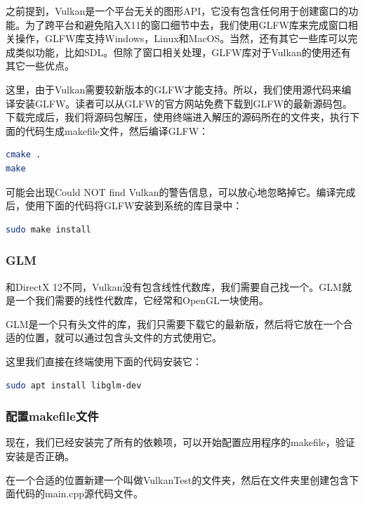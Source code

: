 \documentclass{ctexart}
\begin{document}
之前提到，Vulkan是一个平台无关的图形API，它没有包含任何用于创建窗口的功能。为了跨平台和避免陷入X11的窗口细节中去，我们使用GLFW库来完成窗口相关操作，GLFW库支持Windows，Linux和MacOS。当然，还有其它一些库可以完成类似功能，比如SDL。但除了窗口相关处理，GLFW库对于Vulkan的使用还有其它一些优点。

这里，由于Vulkan需要较新版本的GLFW才能支持。所以，我们使用源代码来编译安装GLFW。读者可以从GLFW的官方网站免费下载到GLFW的最新源码包。下载完成后，我们将源码包解压，使用终端进入解压的源码所在的文件夹，执行下面的代码生成makefile文件，然后编译GLFW：

\begin{lstlisting}[language={bash}]
cmake .
make
\end{lstlisting}

可能会出现Could NOT find Vulkan的警告信息，可以放心地忽略掉它。编译完成后，使用下面的代码将GLFW安装到系统的库目录中：

\begin{lstlisting}[language={bash}]
sudo make install
\end{lstlisting}

\subsubsection{GLM}

和DirectX 12不同，Vulkan没有包含线性代数库，我们需要自己找一个。GLM就是一个我们需要的线性代数库，它经常和OpenGL一块使用。

GLM是一个只有头文件的库，我们只需要下载它的最新版，然后将它放在一个合适的位置，就可以通过包含头文件的方式使用它。

这里我们直接在终端使用下面的代码安装它：

\begin{lstlisting}[language={bash}]
sudo apt install libglm-dev
\end{lstlisting}

\subsubsection{配置makefile文件}

现在，我们已经安装完了所有的依赖项，可以开始配置应用程序的makefile，验证安装是否正确。

在一个合适的位置新建一个叫做VulkanTest的文件夹，然后在文件夹里创建包含下面代码的main.cpp源代码文件。
\end{document}
